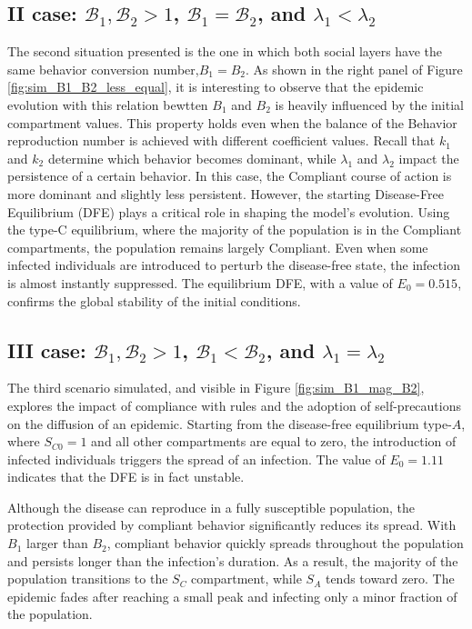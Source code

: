 \subsection{II case: $\mathcal{B}_1, \mathcal{B}_2 >1$, $\mathcal{B}_1 =  \mathcal{B}_2$, and $\lambda_1 < \lambda_2$}
The second situation presented is the one in which both social layers have the same behavior conversion number,$B_1 = B_2$. As shown in the right panel of Figure \ref{fig:sim_B1_B2_less_equal}, it is interesting to observe that the epidemic evolution with this relation bewtten  $B_1$ and $B_2$ is heavily influenced by the initial compartment values. This property holds even when the balance of the Behavior reproduction number is achieved with different coefficient values. Recall that $k_1$ and $k_2$ determine which behavior becomes dominant, while $\lambda_1$ and $\lambda_2$ impact the persistence of a certain behavior. In this case, the Compliant course of action is more dominant and slightly less persistent. However, the starting Disease-Free Equilibrium (DFE) plays a critical role in shaping the model’s evolution. Using the type-C equilibrium, where the majority of the population is in the Compliant compartments, the population remains largely Compliant. Even when some infected individuals are introduced to perturb the disease-free state, the infection is almost instantly suppressed. The equilibrium DFE, with a value of $E_0 = 0.515$, confirms the global stability of the initial conditions.


\subsection{III case: $\mathcal{B}_1, \mathcal{B}_2 >1$, $\mathcal{B}_1 <  \mathcal{B}_2$, and $\lambda_1 = \lambda_2$}
The third scenario simulated, and visible in Figure \ref{fig:sim_B1_mag_B2}, explores the impact of compliance with rules and the adoption of self-precautions on the diffusion of an epidemic. Starting from the disease-free equilibrium type-$A$, where $S_{C0} = 1$ and all other compartments are equal to zero, the introduction of infected individuals triggers the spread of an infection. The value of $E_0 = 1.11$ indicates that the DFE is in fact unstable.

Although the disease can reproduce in a fully susceptible population, the protection provided by compliant behavior significantly reduces its spread. With $B_1$ larger than $B_2$, compliant behavior quickly spreads throughout the population and persists longer than the infection's duration. As a result, the majority of the population transitions to the $S_C$ compartment, while $S_A$ tends toward zero. The epidemic fades after reaching a small peak and infecting only a minor fraction of the population.

